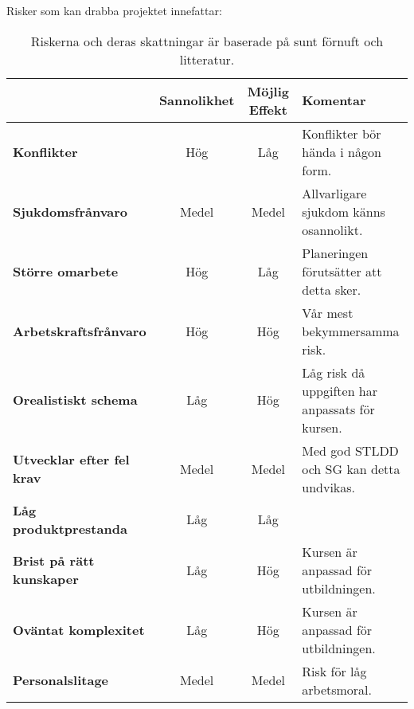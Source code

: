 \documentclass[paper=a4, fontsize=11pt,twoside]{article}
\begin{document}
Risker som kan drabba projektet innefattar: 
\begin{table}[H]
\centering
\begin{tabular}{| l | c | c | p{5cm} |}
\hline
	& \textbf{Sannolikhet} & \textbf{Möjlig Effekt} & \textbf{Komentar} \\
\hline
\textbf{Konflikter} & Hög & Låg & Konflikter bör hända i någon form. \\
\hline
\textbf{Sjukdomsfrånvaro} & Medel & Medel & Allvarligare sjukdom känns osannolikt. \\
\hline
\textbf{Större omarbete} & Hög & Låg & Planeringen förutsätter att detta sker. \\
\hline
\textbf{Arbetskraftsfrånvaro} & Hög & Hög & Vår mest bekymmersamma risk. \\
\hline
\textbf{Orealistiskt schema} & Låg & Hög & Låg risk då uppgiften har anpassats för kursen.\\
\hline
\textbf{Utvecklar efter fel krav} & Medel & Medel & Med god STLDD och SG kan detta undvikas. \\
\hline
\textbf{Låg produktprestanda} & Låg & Låg &  \\
\hline
\textbf{Brist på rätt kunskaper} & Låg & Hög & Kursen är anpassad för utbildningen. \\
\hline
\textbf{Oväntat komplexitet} & Låg & Hög & Kursen är anpassad för utbildningen.  \\
\hline
\textbf{Personalslitage} & Medel & Medel & Risk för låg arbetsmoral. \\
\hline

\end{tabular}
{ \fontsize{6pt}{0.2cm}\selectfont \caption{Riskerna och deras skattningar är baserade på sunt förnuft och litteratur.}}
\end{table}
\end{document}
